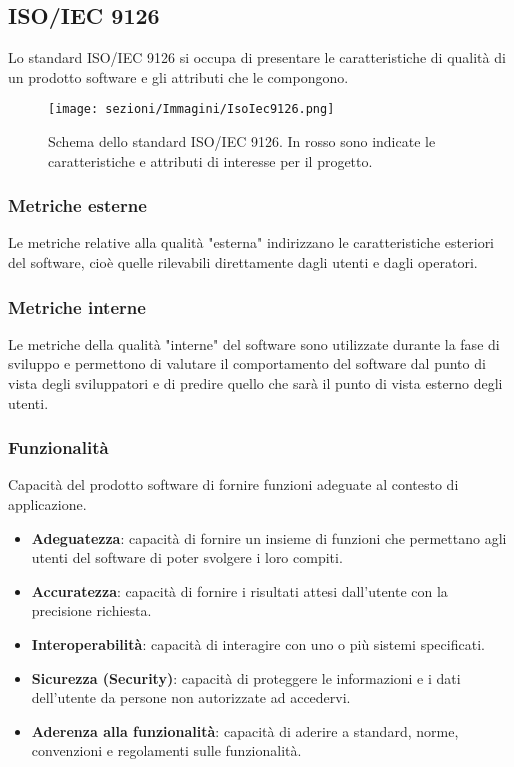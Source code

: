 \subsection{ISO/IEC 9126}
Lo standard ISO/IEC 9126 si occupa di presentare le caratteristiche di qualità di un prodotto software e gli attributi che le compongono.

\begin{figure}[h]
    \centering
    \texttt{[image: sezioni/Immagini/IsoIec9126.png]}
    \caption{Schema dello standard ISO/IEC 9126. In rosso sono indicate le caratteristiche e attributi di interesse per il progetto.}
\end{figure}

\subsubsection{Metriche esterne}
Le metriche relative alla qualità "esterna" indirizzano le caratteristiche esteriori del software, cioè quelle rilevabili direttamente dagli utenti e dagli operatori.

\subsubsection{Metriche interne}
 Le metriche della qualità "interne" del software sono utilizzate durante la fase di sviluppo e permettono di valutare il comportamento del software dal punto di vista degli sviluppatori e di predire quello che sarà il punto di vista esterno degli utenti.

\subsubsection{Funzionalità}
Capacità del prodotto software di fornire funzioni adeguate al contesto di applicazione.
\begin{itemize}
\item \textbf{Adeguatezza}: capacità di fornire un insieme di funzioni che permettano agli utenti del software di poter svolgere i loro compiti.
\item \textbf{Accuratezza}: capacità di fornire i risultati attesi dall’utente con la precisione richiesta.
\item \textbf{Interoperabilità}: capacità di interagire con uno o più sistemi specificati.
\item \textbf{Sicurezza (Security)}: capacità di proteggere le informazioni e i dati dell’utente da persone non autorizzate ad accedervi.
\item \textbf{Aderenza alla funzionalità}: capacità di aderire a standard, norme, convenzioni e regolamenti sulle funzionalità.
\end{itemize}

